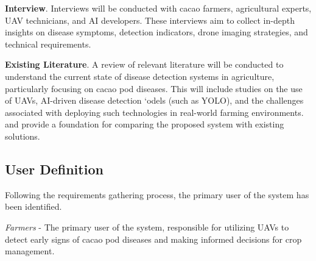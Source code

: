 \textbf{Interview}. Interviews will be conducted with cacao farmers, agricultural experts, UAV technicians, and AI developers. These interviews aim to collect in-depth insights on disease symptoms, detection indicators, drone imaging strategies, and technical requirements.

\textbf{Existing Literature}. A review of relevant literature will be conducted to understand
the current state of disease detection systems in agriculture, particularly focusing on cacao
pod diseases. This will include studies on the use of UAVs, AI-driven disease detection
`odels (such as YOLO), and the challenges associated with deploying such technologies
in real-world farming environments. and provide a foundation for comparing the proposed
system with existing solutions.

\subsection{User Definition}
Following the requirements gathering process, the primary user of the system has been identified.

\textit{Farmers} - The primary user of the system, responsible for utilizing UAVs to detect early signs of cacao pod diseases and making informed decisions for crop management.

